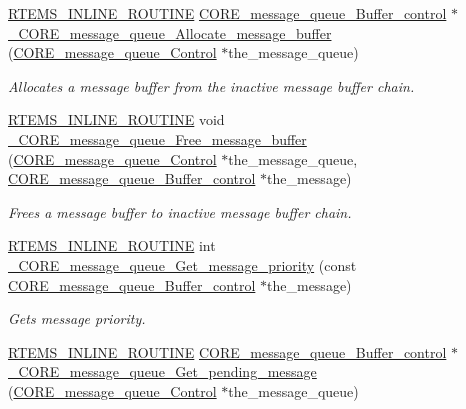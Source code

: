 \begin{DoxyCompactItemize}
\mbox{\hyperlink{group__RTEMSScoreBaseDefs_gac216239df231d5dbd15e3520b0b9313f}{R\+T\+E\+M\+S\+\_\+\+I\+N\+L\+I\+N\+E\+\_\+\+R\+O\+U\+T\+I\+NE}} \mbox{\hyperlink{structCORE__message__queue__Buffer__control}{C\+O\+R\+E\+\_\+message\+\_\+queue\+\_\+\+Buffer\+\_\+control}} $\ast$ \mbox{\hyperlink{group__RTEMSScoreMessageQueue_ga58f369b0c41641f951f6d9eb4cc902d0}{\+\_\+\+C\+O\+R\+E\+\_\+message\+\_\+queue\+\_\+\+Allocate\+\_\+message\+\_\+buffer}} (\mbox{\hyperlink{structCORE__message__queue__Control}{C\+O\+R\+E\+\_\+message\+\_\+queue\+\_\+\+Control}} $\ast$the\+\_\+message\+\_\+queue)
\begin{DoxyCompactList}\small\item\em Allocates a message buffer from the inactive message buffer chain. \end{DoxyCompactList}\item 
\mbox{\hyperlink{group__RTEMSScoreBaseDefs_gac216239df231d5dbd15e3520b0b9313f}{R\+T\+E\+M\+S\+\_\+\+I\+N\+L\+I\+N\+E\+\_\+\+R\+O\+U\+T\+I\+NE}} void \mbox{\hyperlink{group__RTEMSScoreMessageQueue_ga72417493b43560bd9513c4aaba4fbe45}{\+\_\+\+C\+O\+R\+E\+\_\+message\+\_\+queue\+\_\+\+Free\+\_\+message\+\_\+buffer}} (\mbox{\hyperlink{structCORE__message__queue__Control}{C\+O\+R\+E\+\_\+message\+\_\+queue\+\_\+\+Control}} $\ast$the\+\_\+message\+\_\+queue, \mbox{\hyperlink{structCORE__message__queue__Buffer__control}{C\+O\+R\+E\+\_\+message\+\_\+queue\+\_\+\+Buffer\+\_\+control}} $\ast$the\+\_\+message)
\begin{DoxyCompactList}\small\item\em Frees a message buffer to inactive message buffer chain. \end{DoxyCompactList}\item 
\mbox{\hyperlink{group__RTEMSScoreBaseDefs_gac216239df231d5dbd15e3520b0b9313f}{R\+T\+E\+M\+S\+\_\+\+I\+N\+L\+I\+N\+E\+\_\+\+R\+O\+U\+T\+I\+NE}} int \mbox{\hyperlink{group__RTEMSScoreMessageQueue_ga2d7c15075a18043190881cede6cb6749}{\+\_\+\+C\+O\+R\+E\+\_\+message\+\_\+queue\+\_\+\+Get\+\_\+message\+\_\+priority}} (const \mbox{\hyperlink{structCORE__message__queue__Buffer__control}{C\+O\+R\+E\+\_\+message\+\_\+queue\+\_\+\+Buffer\+\_\+control}} $\ast$the\+\_\+message)
\begin{DoxyCompactList}\small\item\em Gets message priority. \end{DoxyCompactList}\item 
\mbox{\hyperlink{group__RTEMSScoreBaseDefs_gac216239df231d5dbd15e3520b0b9313f}{R\+T\+E\+M\+S\+\_\+\+I\+N\+L\+I\+N\+E\+\_\+\+R\+O\+U\+T\+I\+NE}} \mbox{\hyperlink{structCORE__message__queue__Buffer__control}{C\+O\+R\+E\+\_\+message\+\_\+queue\+\_\+\+Buffer\+\_\+control}} $\ast$ \mbox{\hyperlink{group__RTEMSScoreMessageQueue_gaae44a17e0ce00b0cff6f9894f4fe9845}{\+\_\+\+C\+O\+R\+E\+\_\+message\+\_\+queue\+\_\+\+Get\+\_\+pending\+\_\+message}} (\mbox{\hyperlink{structCORE__message__queue__Control}{C\+O\+R\+E\+\_\+message\+\_\+queue\+\_\+\+Control}} $\ast$the\+\_\+message\+\_\+queue)

\end{DoxyCompactItemize}
